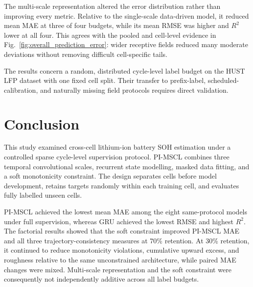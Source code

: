 \documentclass[pdflatex,sn-mathphys-num]{sn-jnl}
\begin{document}
The multi-scale representation altered the error distribution rather than improving every metric. Relative to the single-scale data-driven model, it reduced mean MAE at three of four budgets, while its mean RMSE was higher and $R^2$ lower at all four. This agrees with the pooled and cell-level evidence in Fig.~\ref{fig:overall_prediction_error}: wider receptive fields reduced many moderate deviations without removing difficult cell-specific tails.

The results concern a random, distributed cycle-level label budget on the HUST LFP dataset with one fixed cell split. Their transfer to prefix-label, scheduled-calibration, and naturally missing field protocols requires direct validation.


\section{Conclusion}
\label{sec:conclusion}

This study examined cross-cell lithium-ion battery SOH estimation under a controlled sparse cycle-level supervision protocol. PI-MSCL combines three temporal convolutional scales, recurrent state modelling, masked data fitting, and a soft monotonicity constraint. The design separates cells before model development, retains targets randomly within each training cell, and evaluates fully labelled unseen cells.

PI-MSCL achieved the lowest mean MAE among the eight same-protocol models under full supervision, whereas GRU achieved the lowest RMSE and highest $R^2$. The factorial results showed that the soft constraint improved PI-MSCL MAE and all three trajectory-consistency measures at 70\% retention. At 30\% retention, it continued to reduce monotonicity violations, cumulative upward excess, and roughness relative to the same unconstrained architecture, while paired MAE changes were mixed. Multi-scale representation and the soft constraint were consequently not independently additive across all label budgets.
\end{document}
